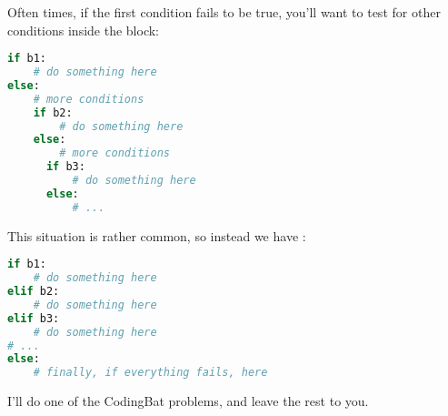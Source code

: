 
Often times, if the first condition fails to be true, you'll want to
test for other conditions inside the  block:

\begin{lstlisting}[language=Python]
if b1:
    # do something here
else:
    # more conditions
    if b2:
        # do something here
    else:
        # more conditions
      if b3:
          # do something here
      else:
          # ...
\end{lstlisting}

This situation is rather common, so instead we have :

\begin{lstlisting}[language=Python]
if b1:
    # do something here
elif b2:
    # do something here
elif b3:
    # do something here
# ...
else:
    # finally, if everything fails, here
\end{lstlisting}

I'll do one of the CodingBat problems, and leave the rest to you.

